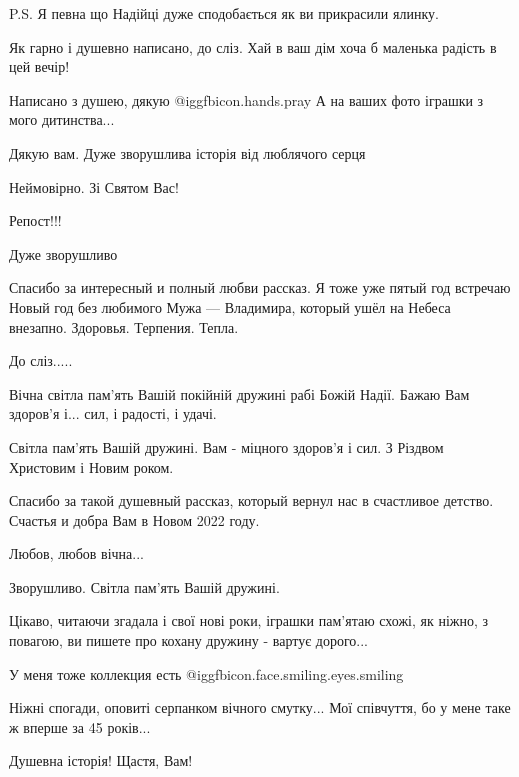 \begin{itemize}
P.S. Я певна що Надійці дуже сподобається як ви прикрасили ялинку.


Як гарно і душевно написано, до сліз. Хай в ваш дім хоча б маленька радість в
цей вечір!


Написано з душею, дякую  @igg{fbicon.hands.pray}  А на ваших фото іграшки з
мого дитинства...

Дякую вам. Дуже зворушлива історія від люблячого серця

Неймовірно. Зі Святом Вас!

Репост!!!

Дуже зворушливо


Спасибо за интересный и полный любви рассказ. Я тоже уже пятый год встречаю
Новый год без любимого Мужа — Владимира, который ушёл на Небеса внезапно.
Здоровья. Терпения. Тепла.

До сліз.....

Вічна світла пам'ять Вашій покійній дружині рабі Божій Надії. Бажаю Вам здоров'я і... сил, і радості, і удачі.

Світла пам'ять Вашій дружині. Вам - міцного здоров'я і сил. З Різдвом Христовим і Новим роком.


Спасибо за такой душевный рассказ, который вернул нас в счастливое детство.
Счастья и добра Вам в Новом 2022 году.

Любов, любов вічна...

Зворушливо. Світла пам'ять Вашій дружині.


Цікаво, читаючи згадала і свої нові роки, іграшки пам'ятаю схожі, як ніжно, з
повагою, ви пишете про кохану дружину - вартує дорого...

У меня тоже коллекция есть @igg{fbicon.face.smiling.eyes.smiling} 

Ніжні спогади, оповиті серпанком вічного смутку...
Мої співчуття, бо у мене таке ж вперше за 45 років...

Душевна історія! Щастя, Вам!


\end{itemize}
